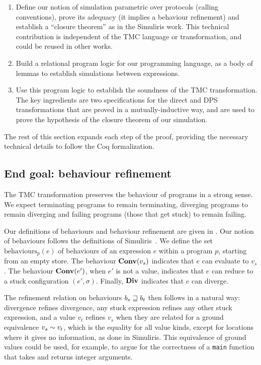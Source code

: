 \begin{enumerate}

\item Define our notion of simulation parametric over protocols (calling conventions), prove its adequacy (it implies a behaviour refinement) and establish a ``closure theorem'' as in the Simuliris work.
%
  This technical contribution is independent of the TMC language or transformation, and could be reused in other works.

\item Build a relational program logic for our programming language, as a body of lemmas to establish simulations between expressions.

\item Use this program logic to establish the soundness of the TMC transformation.
%
The key ingredients are two specifications for the direct and DPS transformations that are proved in a mutually-inductive way, and are used to prove the hypothesis of the closure theorem of our simulation.
\end{enumerate}

The rest of this section expands each step of the proof, providing the necessary technical details to follow the Coq formalization.

\subsection{End goal: behaviour refinement}

The TMC transformation preserves the behaviour of programs in a strong sense.
%
We expect terminating programs to remain terminating, diverging programs to remain diverging and failing programs (those that get 
stuck) to remain failing.

Our definitions of behaviours and behaviour refinement are given in .
%
Our notion of behaviours follows the definitions of Simuliris~\citep*{TODO-simuliris}.
%
We define the set $\mathrm{behaviours}_p(e)$ of behaviours of an expression $e$ within a program $p$, starting from an empty store.
%
The behaviour $\constr{Conv}(v_s)$ indicates that $e$ can evaluate to $v_s$.
%
The behaviour $\constr{Conv}(e')$, when $e'$ is not a value, indicates that $e$ can reduce to a stuck configuration $(e', \sigma)$.
%
Finally, $\constr{Div}$ indicates that $e$ can diverge.

The refinement relation on behaviours $b_s \sqsupseteq b_t$ then follows in a natural way: divergence refines divergence, any stuck expression refines any other stuck expression, and a value $v_t$ refines $v_s$ when they are related for a ground equivalence $v_s \sim v_t$, which is the equality for all value kinds, except for locations where it gives no information, as done in Simuliris.
%
This equivalence of ground values could be used, for example, to argue for the correctness of a \texttt{main} function that takes and returns integer arguments.

